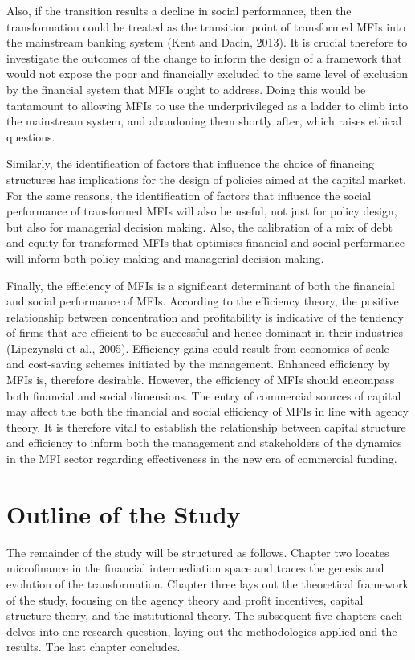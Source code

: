 \documentclass[a4paper, nobind]{templates/ociamthesis}
\begin{document}
Also, if the transition results a decline in social performance, then the transformation could be treated as the transition point of transformed MFIs into the mainstream banking system (Kent and Dacin, 2013). It is crucial therefore to investigate the outcomes of the change to inform the design of a framework that would not expose the poor and financially excluded to the same level of exclusion by the financial system that MFIs ought to address. Doing this would be tantamount to allowing MFIs to use the underprivileged as a ladder to climb into the mainstream system, and abandoning them shortly after, which raises ethical questions.

Similarly, the identification of factors that influence the choice of financing structures has implications for the design of policies aimed at the capital market. For the same reasons, the identification of factors that influence the social performance of transformed MFIs will also be useful, not just for policy design, but also for managerial decision making. Also, the calibration of a mix of debt and equity for transformed MFIs that optimises financial and social performance will inform both policy-making and managerial decision making.

Finally, the efficiency of MFIs is a significant determinant of both the financial and social performance of MFIs. According to the efficiency theory, the positive relationship between concentration and profitability is indicative of the tendency of firms that are efficient to be successful and hence dominant in their industries (Lipczynski et al., 2005). Efficiency gains could result from economies of scale and cost-saving schemes initiated by the management. Enhanced efficiency by MFIs is, therefore desirable. However, the efficiency of MFIs should encompass both financial and social dimensions. The entry of commercial sources of capital may affect the both the financial and social efficiency of MFIs in line with agency theory. It is therefore vital to establish the relationship between capital structure and efficiency to inform both the management and stakeholders of the dynamics in the MFI sector regarding effectiveness in the new era of commercial funding.

\hypertarget{outline-of-the-study}{%
\section{Outline of the Study}\label{outline-of-the-study}}

\noindent The remainder of the study will be structured as follows. Chapter two locates microfinance in the financial intermediation space and traces the genesis and evolution of the transformation. Chapter three lays out the theoretical framework of the study, focusing on the agency theory and profit incentives, capital structure theory, and the institutional theory. The subsequent five chapters each delves into one research question, laying out the methodologies applied and the results. The last chapter concludes.
\end{document}
